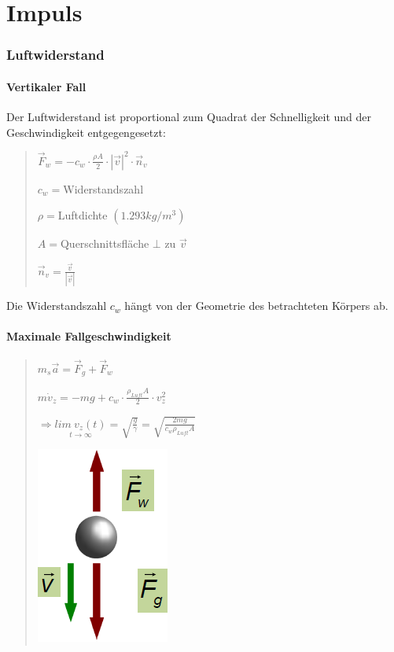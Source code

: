 
\part*{Impuls}


\section*{Luftwiderstand}


\subsection*{Vertikaler Fall}

Der Luftwiderstand ist proportional zum Quadrat der Schnelligkeit
und der Geschwindigkeit entgegengesetzt:
\begin{verse}
$\vec{F}_{w}=-c_{w}\cdot\frac{\rho A}{2}\cdot|\vec{v}|^{2}\cdot\vec{n}_{v}$

$c_{w}=$Widerstandszahl

\emph{$\rho=$}Luftdichte\emph{ $(1.293kg/m^{3})$}

$A=$Querschnittsfläche $\bot$ zu $\vec{v}$

$\vec{n}_{v}=\frac{\vec{v}}{|\vec{v}|}$
\end{verse}
Die Widerstandszahl $c_{w}$ hängt von der Geometrie des betrachteten
Körpers ab.


\subsection*{Maximale Fallgeschwindigkeit}
\begin{verse}
$m_{s}\vec{a}=\vec{F}_{g}+\vec{F}_{w}$

$m\dot{v}_{z}=-mg+c_{w}\cdot\frac{\rho_{Luft}A}{2}\cdot v_{z}^{2}$

$\Rightarrow\underset{t\rightarrow\infty}{lim\: v_{z}(t)}=\sqrt{\frac{g}{\gamma}}=\sqrt{\frac{2mg}{c_{w}\rho_{Luft}A}}$

\includegraphics[scale=0.6]{Impuls/Fallgeschwindigkeit}
\end{verse}

